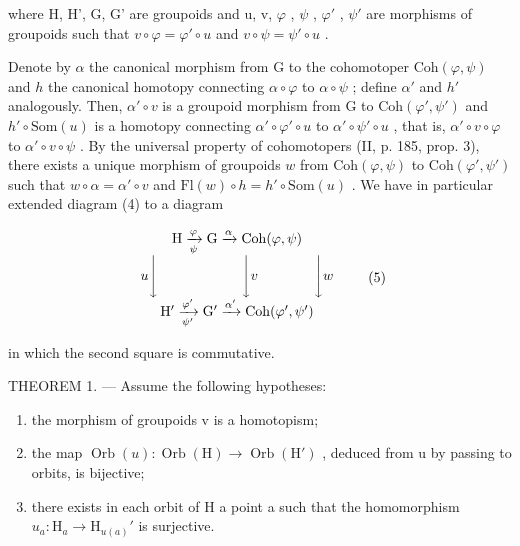 where H, H', G, G' are groupoids and u, v, \(\varphi\) , \(\psi\) , \(\varphi'\) , \(\psi'\) are morphisms of groupoids such that \(v \circ \varphi = \varphi' \circ u\) and \(v \circ \psi = \psi' \circ u\) .

Denote by \(\alpha\) the canonical morphism from G to the cohomotoper \(\mathrm{Coh}(\varphi, \psi)\) and \(h\) the canonical homotopy connecting \(\alpha \circ \varphi\) to \(\alpha \circ \psi\) ; define \(\alpha'\) and \(h'\) analogously. Then, \(\alpha' \circ v\) is a groupoid morphism from G to \(\mathrm{Coh}(\varphi', \psi')\) and \(h' \circ \mathrm{Som}(u)\) is a homotopy connecting \(\alpha' \circ \varphi' \circ u\) to \(\alpha' \circ \psi' \circ u\) , that is, \(\alpha' \circ v \circ \varphi\) to \(\alpha' \circ v \circ \psi\) . By the universal property of cohomotopers (II, p. 185, prop. 3), there exists a unique morphism of groupoids \(w\) from \(\mathrm{Coh}(\varphi, \psi)\) to \(\mathrm{Coh}(\varphi', \psi')\) such that \(w \circ \alpha = \alpha' \circ v\) and \(\mathrm{Fl}(w) \circ h = h' \circ \mathrm{Som}(u)\) . We have in particular extended diagram (4) to a diagram

\[
\begin{array}{c} \mathrm{H} \xrightarrow [ \psi ]{\varphi} \mathrm{G} \xrightarrow {\alpha} \mathrm{Coh} (\varphi , \psi) \\ u \Biggl \downarrow \qquad \qquad \qquad \Biggl \downarrow v \qquad \qquad \Biggl \downarrow w \\ \mathrm{H} ^ {\prime} \xrightarrow [ \psi^ {\prime} ]{\varphi^ {\prime}} \mathrm{G} ^ {\prime} \xrightarrow {\alpha^ {\prime}} \mathrm{Coh} (\varphi^ {\prime}, \psi^ {\prime}) \end{array}\tag{5}
\]

in which the second square is commutative.

THEOREM 1. --- Assume the following hypotheses:

\begin{enumerate}
\def\labelenumi{(\roman{enumi})}
\item
  the morphism of groupoids v is a homotopism;
\item
  the map \(\operatorname{Orb}(u)\colon\operatorname{Orb}(\mathrm{H})\to\operatorname{Orb}(\mathrm{H}')\) , deduced from u by passing to orbits, is bijective;
\item
  there exists in each orbit of H a point a such that the homomorphism \(u_a \colon \mathrm{H}_a \to \mathrm{H}_{u(a)}'\) is surjective.
\end{enumerate}

